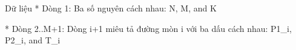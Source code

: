 Dữ liệu
* Dòng 1: Ba số nguyên cách nhau: N, M, and K  

   * Dòng 2..M+1: Dòng i+1 miêu tả đường mòn i với ba dấu cách nhau: P1\_i, P2\_i, and T\_i